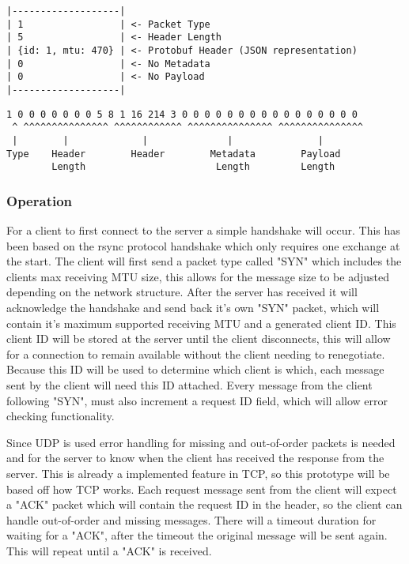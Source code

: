 \begin{minipage}{\textwidth}
    \begin{lstlisting}[caption={Prototype One Example Packet Structure},label=lst:p1d-example-structure]
|-------------------|
| 1                 | <- Packet Type
| 5                 | <- Header Length
| {id: 1, mtu: 470} | <- Protobuf Header (JSON representation)
| 0                 | <- No Metadata
| 0                 | <- No Payload
|-------------------|
\end{lstlisting}

    \begin{lstlisting}[caption={Prototype One Example Packet Binary},label=lst:p1d-example-binary]
 1 0 0 0 0 0 0 0 5 8 1 16 214 3 0 0 0 0 0 0 0 0 0 0 0 0 0 0 0 0
 ^ ^^^^^^^^^^^^^^^ ^^^^^^^^^^^^ ^^^^^^^^^^^^^^^ ^^^^^^^^^^^^^^^
 |        |             |              |               |
Type    Header        Header        Metadata        Payload
        Length                       Length         Length
\end{lstlisting}
\end{minipage}

\subsubsection*{Operation}
For a client to first connect to the server a simple handshake will occur. This has been based on the rsync protocol handshake which only requires one exchange at the start. The client will first send a packet type called "SYN" which includes the clients max receiving MTU size, this allows for the message size to be adjusted depending on the network structure. After the server has received it will acknowledge the handshake and send back it's own "SYN" packet, which will contain it's maximum supported receiving MTU and a generated client ID. This client ID will be stored at the server until the client disconnects, this will allow for a connection to remain available without the client needing to renegotiate. Because this ID will be used to determine which client is which, each message sent by the client will need this ID attached. Every message from the client following "SYN", must also increment a request ID field, which will allow error checking functionality.

Since UDP is used error handling for missing and out-of-order packets is needed and for the server to know when the client has received the response from the server. This is already a implemented feature in TCP, so this prototype will be based off how TCP works. Each request message sent from the client will expect a "ACK" packet which will contain the request ID in the header, so the client can handle out-of-order and missing messages. There will a timeout duration for waiting for a "ACK", after the timeout the original message will be sent again. This will repeat until a "ACK" is received.

